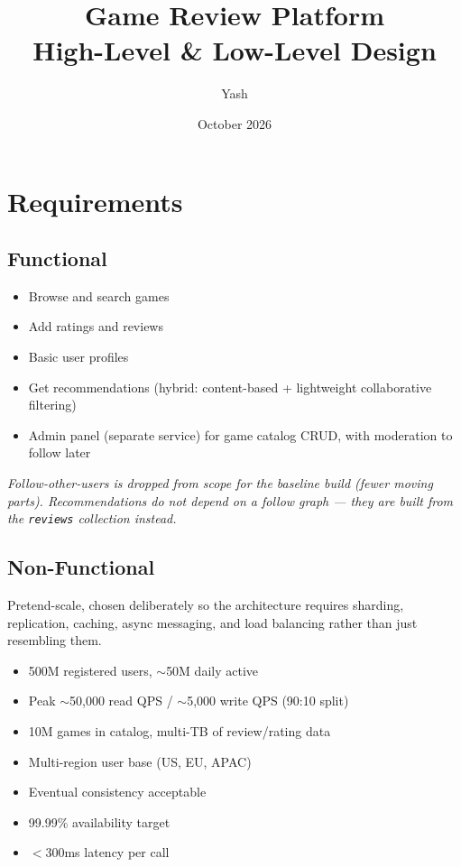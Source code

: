 \documentclass[11pt]{article}
\title{\Large\textbf{Game Review Platform} \\ \large High-Level \& Low-Level Design}
\author{Yash}
\date{October 2026}
\begin{document}
\maketitle
\thispagestyle{fancy}

\tableofcontents
\newpage

\section{Requirements}

\subsection{Functional}
\begin{itemize}[nosep]
    \item Browse and search games
    \item Add ratings and reviews
    \item Basic user profiles
    \item Get recommendations (hybrid: content-based + lightweight collaborative filtering)
    \item Admin panel (separate service) for game catalog CRUD, with moderation to follow later
\end{itemize}

\textit{Follow-other-users is dropped from scope for the baseline build (fewer moving parts). Recommendations do not depend on a follow graph --- they are built from the \texttt{reviews} collection instead.}

\subsection{Non-Functional}
Pretend-scale, chosen deliberately so the architecture requires sharding, replication, caching, async messaging, and load balancing rather than just resembling them.

\begin{itemize}[nosep]
    \item 500M registered users, $\sim$50M daily active
    \item Peak $\sim$50{,}000 read QPS / $\sim$5{,}000 write QPS (90:10 split)
    \item 10M games in catalog, multi-TB of review/rating data
    \item Multi-region user base (US, EU, APAC)
    \item Eventual consistency acceptable
    \item 99.99\% availability target
    \item $<$300ms latency per call
\end{itemize}
\end{document}
